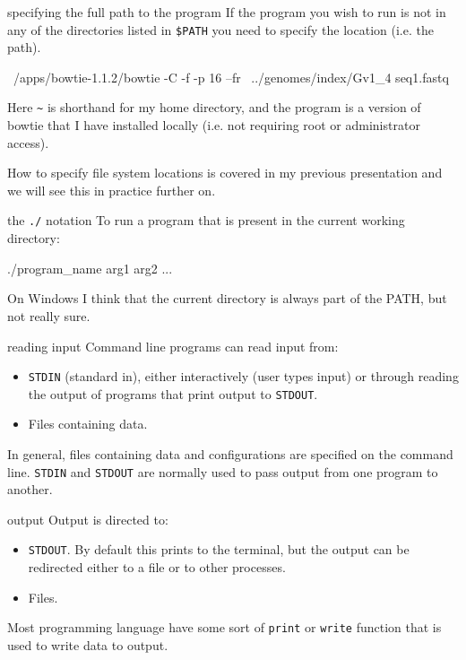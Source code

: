 \documentclass[pdf]{beamer}
\begin{document}
\begin{frame}[fragile]{specifying the full path to the program}
  If the program you wish to run is not in any of the directories listed in
  \texttt{\$PATH} you need to specify the location (i.e. the path).

  \begin{shcode}
    ~/apps/bowtie-1.1.2/bowtie -C -f -p 16 --fr \
         ../genomes/index/Gv1_4 seq1.fastq
  \end{shcode}
  
  Here \texttt{\textasciitilde} is shorthand for my home directory, and the program is a version
  of bowtie that I have installed locally (i.e. not requiring root or
  administrator access).

  How to specify file system locations is covered in my previous presentation
  and we will see this in practice further on.
\end{frame}

\begin{frame}[fragile]{the \texttt{./} notation}
  To run a program that is present in the current working directory:

  \begin{shcode}
    ./program_name arg1 arg2 ...
  \end{shcode}

  On Windows I think that the current directory is always part of the PATH,
  but not really sure.
\end{frame}

\begin{frame}[fragile]{reading input}
  Command line programs can read input from:

  \begin{itemize}
  \item \texttt{STDIN} (standard in), either interactively (user types input)
    or through reading the output of programs that print output to
    \texttt{STDOUT}.
  \item Files containing data.
  \end{itemize}

  In general, files containing data and configurations are specified on the
  command line. \texttt{STDIN} and \texttt{STDOUT} are normally used to pass
  output from one program to another.
\end{frame}

\begin{frame}[fragile]{output}
  Output is directed to:
  \begin{itemize}
  \item \texttt{STDOUT}. By default this prints to the terminal, but the
    output can be redirected either to a file or to other processes.
  \item Files.
  \end{itemize}

  Most programming language have some sort of \texttt{print} or \texttt{write}
  function that is used to write data to output.
\end{frame}
\end{document}
